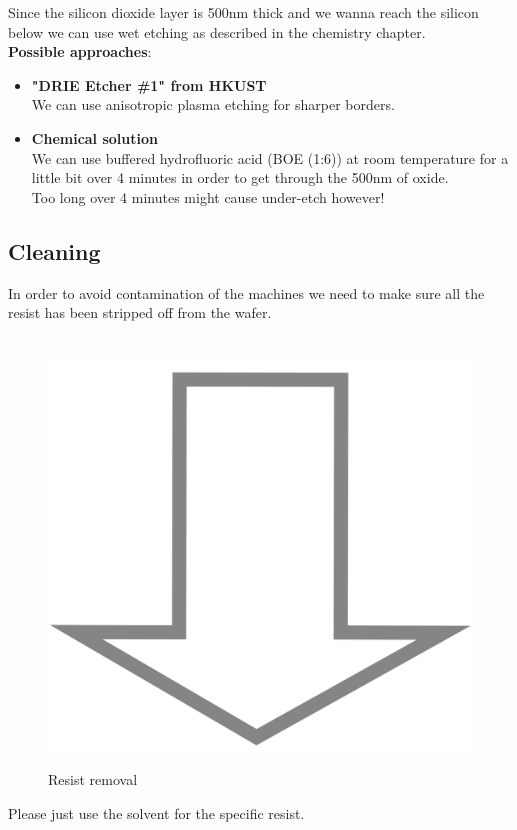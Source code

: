 Since the silicon dioxide layer is 500nm thick and we wanna reach the silicon below we can use wet etching as described in the chemistry chapter.\\

\textbf{Possible approaches}:
\begin{itemize}
	\item \textbf{"DRIE Etcher \#1" from HKUST} \\
	We can use anisotropic plasma etching for sharper borders.
	\item \textbf{Chemical solution} \\
	We can use buffered hydrofluoric acid (BOE (1:6)) at room temperature for a little bit over 4 minutes in order to get through the 500nm of oxide.\\
	Too long over 4 minutes might cause under-etch however!
\end{itemize}

\subsection{Cleaning}
In order to avoid contamination of the machines we need to make sure all the resist has been stripped off from the wafer.
\begin{figure}[H]
	\centering
	\begin{tikzpicture}[node distance = 3cm, auto, thick,scale=\CrossSectionOnly, every node/.style={transform shape}]
		
	\end{tikzpicture} \\
	\includegraphics[scale=0.01]{down_arrow.png} \\
	\begin{tikzpicture}[node distance = 3cm, auto, thick,scale=\CrossSectionOnly, every node/.style={transform shape}]
		
	\end{tikzpicture}
	\caption{Resist removal}
\end{figure}
Please just use the solvent for the specific resist.

